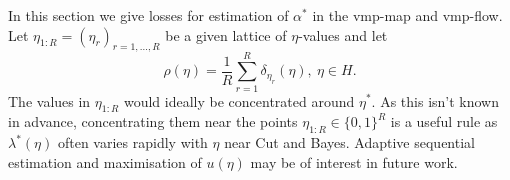 

 



In this section we give losses for estimation of $\alpha^*$ in the \acrshort*{vmp}-map and \acrshort*{vmp}-flow. Let $\eta_{1:R}=(\eta_r)_{r=1,...,R}$ be a given lattice of $\eta$-values and let
\[\rho(\eta)=\frac{1}{R}\sum_{r=1}^R \delta_{\eta_r}(\eta),\ \eta\in H.\]
The values in $\eta_{1:R}$ would ideally be concentrated around $\eta^*$. As this isn't known in advance, concentrating them near the points $\eta_{1:R}\in \{0,1\}^R$ is a useful rule as $\lambda^*(\eta)$ often varies rapidly with $\eta$ near Cut and Bayes. Adaptive sequential estimation and maximisation of $u(\eta)$ may be of interest in future work.

